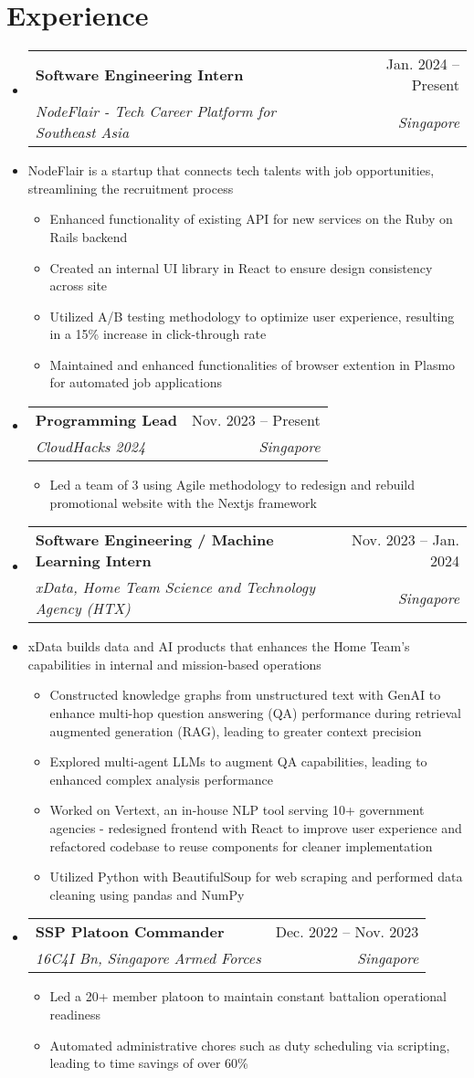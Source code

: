 \documentclass[letterpaper,11pt]{article}
\makeatletter
\newcommand{\resumeItem}[1]{
  \item\small{
    {#1 \vspace{-2pt}}
  }
}
\newcommand{\resumeDescription}[1]{
  \item\small{
    {#1 \vspace{-7pt}}
  }
}
\newcommand{\resumeSubheading}[4]{
  \vspace{-2pt}\item
    \begin{tabular*}{0.97\textwidth}[t]{l@{\extracolsep{\fill}}r}
      \textbf{#1} & #2 \\
      \textit{\small#3} & \textit{\small #4} \\
    \end{tabular*}\vspace{-7pt}
}
\newcommand{\resumeSubHeadingListStart}{\begin{itemize}[leftmargin=0.15in, label={}]}
\newcommand{\resumeSubHeadingListEnd}{\end{itemize}}
\newcommand{\resumeItemListStart}{\begin{itemize}}
\newcommand{\resumeItemListEnd}{\end{itemize}\vspace{-5pt}}
\makeatother
\begin{document}
\section{Experience}
  \resumeSubHeadingListStart
    \resumeSubheading
      {Software Engineering Intern}{Jan. 2024 -- Present}
      {NodeFlair - Tech Career Platform for Southeast Asia}{Singapore}
      \resumeDescription{NodeFlair is a startup that connects tech talents with job opportunities, streamlining the recruitment process}
      \resumeItemListStart
        \resumeItem{Enhanced functionality of existing API for new services on the Ruby on Rails backend}
        \resumeItem{Created an internal UI library in React to ensure design consistency across site}
        \resumeItem{Utilized A/B testing methodology to optimize user experience, resulting in a 15\% increase in click-through rate}
        \resumeItem{Maintained and enhanced functionalities of browser extention in Plasmo for automated job applications}
      \resumeItemListEnd
    \resumeSubheading
      {Programming Lead}{Nov. 2023 -- Present}
      {CloudHacks 2024}{Singapore}
      \resumeItemListStart
        \resumeItem{Led a team of 3 using Agile methodology to redesign and rebuild promotional website with the Nextjs framework}
      \resumeItemListEnd
    \resumeSubheading
      {Software Engineering / Machine Learning Intern}{Nov. 2023 -- Jan. 2024}
      {xData, Home Team Science and Technology Agency (HTX)}{Singapore}
      \resumeDescription{xData builds data and AI products that enhances the Home Team's capabilities in internal and mission-based operations}
      \resumeItemListStart
        \resumeItem{Constructed knowledge graphs from unstructured text with GenAI to enhance multi-hop question answering (QA) performance during retrieval augmented generation (RAG), leading to greater context precision}
        \resumeItem{Explored multi-agent LLMs to augment QA capabilities, leading to enhanced complex analysis performance}
        \resumeItem{Worked on Vertext, an in-house NLP tool serving 10+ government agencies - redesigned frontend with React to improve user experience and refactored codebase to reuse components for cleaner implementation}
        \resumeItem{Utilized Python with BeautifulSoup for web scraping and performed data cleaning using pandas and NumPy}
      \resumeItemListEnd
    \resumeSubheading
      {SSP Platoon Commander}{Dec. 2022 -- Nov. 2023}
      {16C4I Bn, Singapore Armed Forces}{Singapore}
      \resumeItemListStart
        \resumeItem{Led a 20+ member platoon to maintain constant battalion operational readiness}
        \resumeItem{Automated administrative chores such as duty scheduling via scripting, leading to time savings of over 60\%}
      \resumeItemListEnd
  \resumeSubHeadingListEnd
\end{document}
